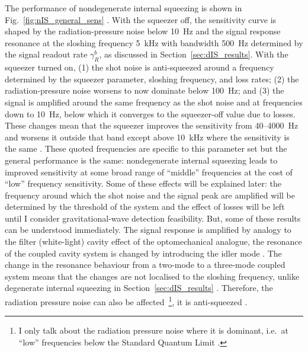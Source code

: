 The performance of nondegenerate internal squeezing is shown in Fig.~\ref{fig:nIS_general_sens} . 
With the squeezer off, the sensitivity curve is shaped by the radiation-pressure noise below 10~Hz and the signal response resonance at the sloshing frequency 5~kHz with bandwidth 500~Hz determined by the signal readout rate $\gamma^b_R$, as discussed in Section~\ref{sec:dIS_results}. With the squeezer turned on, (1) the shot noise is anti-squeezed around a frequency determined by the squeezer parameter, sloshing frequency, and loss rates; (2) the radiation-pressure noise worsens to now dominate below 100~Hz; and (3) the signal is amplified around the same frequency as the shot noise and at frequencies down to 10~Hz, below which it converges to the squeezer-off value due to losses. These changes mean that the squeezer improves the sensitivity from 40--4000~Hz and worsens it outside that band except above 10~kHz where the sensitivity is the same .
These quoted frequencies are specific to this parameter set but the general performance is the same: nondegenerate internal squeezing leads to improved sensitivity at some broad range of ``middle'' frequencies at the cost of ``low'' frequency sensitivity. 
Some of these effects will be explained later: the frequency around which the shot noise and the signal peak are amplified will be determined by the threshold of the system and the effect of losses will be left until I consider gravitational-wave detection feasibility. But, some of these results can be understood immediately.
The signal response is amplified by analogy to the filter (white-light) cavity effect of the optomechanical analogue, the resonance of the coupled cavity system is changed by introducing the idler mode . The change in the resonance behaviour from a two-mode to a three-mode coupled system means that the changes are not localised to the sloshing frequency, unlike degenerate internal squeezing in Section~\ref{sec:dIS_results} . 
Therefore, the radiation pressure noise can also be affected~\footnote{I only talk about the radiation pressure noise where it is dominant, i.e.\ at ``low'' frequencies below the Standard Quantum Limit .}, it is anti-squeezed .


